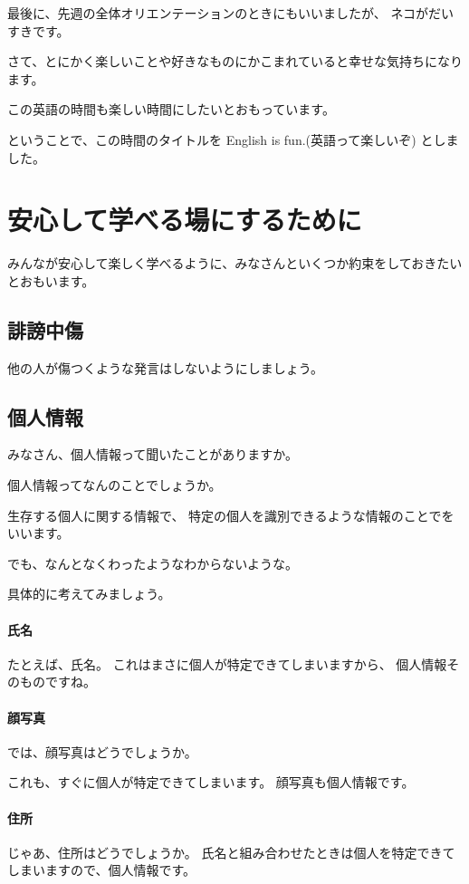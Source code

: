 \documentclass[12pt]{jlreq}
\begin{document}
最後に、先週の全体オリエンテーションのときにもいいましたが、
ネコがだいすきです。

さて、とにかく楽しいことや好きなものにかこまれていると幸せな気持ちになります。

この英語の時間も楽しい時間にしたいとおもっています。

ということで、この時間のタイトルを
English is fun.(英語って楽しいぞ)
としました。

\newpage
\section{安心して学べる場にするために}


みんなが安心して楽しく学べるように、みなさんといくつか約束をしておきたいとおもいます。

\subsection{誹謗中傷}

他の人が傷つくような発言はしないようにしましょう。


\subsection{個人情報}

みなさん、個人情報って聞いたことがありますか。

個人情報ってなんのことでしょうか。


生存する個人に関する情報で、
特定の個人を識別できるような情報のことでをいいます。

でも、なんとなくわったようなわからないような。

具体的に考えてみましょう。

\paragraph{氏名}
たとえば、氏名。
これはまさに個人が特定できてしまいますから、
個人情報そのものですね。

\paragraph{顔写真}
では、顔写真はどうでしょうか。

これも、すぐに個人が特定できてしまいます。
顔写真も個人情報です。

\paragraph{住所}
じゃあ、住所はどうでしょうか。
氏名と組み合わせたときは個人を特定できてしまいますので、個人情報です。
\end{document}
